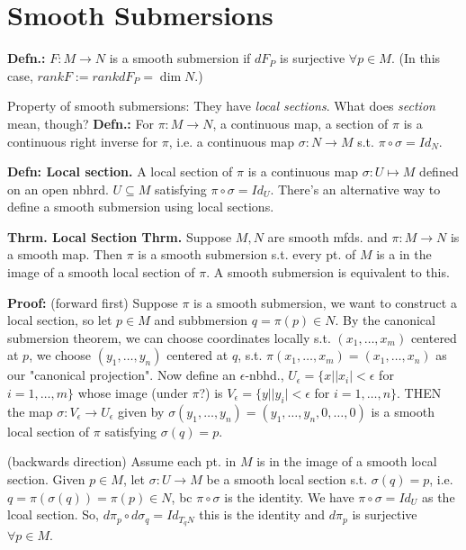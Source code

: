 \documentclass[12pt,letterpaper]{article}
\begin{document}
\section*{Smooth Submersions}

\textbf{Defn.:} $F: M \rightarrow N$ is a smooth submersion if $dF_P$ is surjective $\forall p \in M$. (In this case, $rank F := rank dF_P = \dim N$.)

Property of smooth submersions: They have \textit{local sections}. What does \textit{section} mean, though? \textbf{Defn.:} For $\pi : M \rightarrow N$, a continuous map, a section of $\pi$ is a continuous right inverse for $\pi$, i.e. a continuous map $\sigma: N \rightarrow M$ s.t. $\pi \circ \sigma = Id_N$. 

\textbf{Defn: Local section.} A local section of $\pi$ is a continuous map $\sigma: U \mapsto M$ defined on an open nbhrd. $U \subseteq M$ satisfying $\pi \circ \sigma = Id_U$. There's an alternative way to define a smooth submersion using local sections.

\textbf{Thrm. Local Section Thrm.} Suppose $M, N$ are smooth mfds. and $\pi: M \rightarrow N$ is a smooth map. Then $\pi$ is a smooth submersion s.t. every pt. of $M$ is a in the image of a smooth local section of $\pi$. A smooth submersion is equivalent to this.

\textbf{Proof:} (forward first) Suppose $\pi$ is a smooth submersion, we want to construct a local section, so let $p \in M$ and subbmersion $q = \pi(p) \in N$. By the canonical submersion theorem, we can choose coordinates locally s.t. $(x_1, \dots, x_m)$ centered at $p$, we choose $(y_1, \dots, y_n)$ centered at $q$, s.t. $\pi(x_1, \dots, x_m) = (x_1, \dots, x_n)$ as our "canonical projection". Now define an $\epsilon$-nbhd., $U_{\epsilon} = \{ x | |x_i| < \epsilon$ for $i = 1, \dots, m \}$ whose image (under $\pi$?) is $V_{\epsilon} = \{ y | |y_i| < \epsilon$ for $i = 1, \dots, n\}$. THEN the map $\sigma: V_{\epsilon} \rightarrow U_{\epsilon}$ given by $\sigma(y_1,  \dots, y_n) = (y_1, \dots, y_n, 0 , \dots, 0)$ is a smooth local section of $\pi$ satisfying $\sigma(q) = p$. 

(backwards direction) Assume each pt. in $M$ is in the image of a smooth local section. Given $p \in M$, let $\sigma: U \rightarrow M$ be a smooth local section s.t. $\sigma (q) = p$, i.e. $q = \pi(\sigma(q)) = \pi(p) \in N$, bc $\pi \circ \sigma$ is the identity. We have $\pi \circ \sigma = Id_U$ as the lcoal section. So, $d\pi_p \circ d\sigma_q = Id_{T_qN}$ this is the identity and $d\pi_p$ is surjective $\forall p \in M$. 
\end{document}
